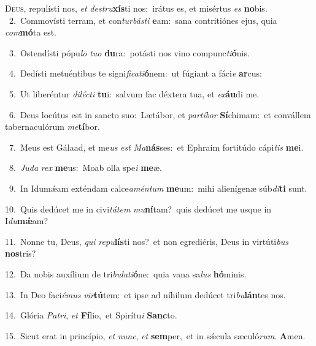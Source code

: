 \lettrine{\initial\textcolor{\initialcolor}{D}}{eus,} repulísti nos, \textit{et} \textit{de}\-\textit{stru}\textbf{xís}ti nos:~\star irátus es, et misértus \textit{es} \textbf{no}\-bis.\\
{\numbfont\textcolor{\numbcolor}{~2.}}~Commovísti terram, et con\-\textit{tur}\-\textit{bás}\textit{ti} \textbf{e}\-am:~\star sana contritiónes ejus, quia \textit{com}\-\textbf{mó}ta est.\par
{\numbfont\textcolor{\numbcolor}{~3.}}~Ostendísti pópu\textit{lo} \textit{tu}\-\textit{o} \textbf{du}\-ra:~\star potásti nos vino compunc\-\textit{ti}\-\textbf{ó}nis.\par
{\numbfont\textcolor{\numbcolor}{~4.}}~Dedísti metuéntibus te signi\-\textit{fi}\-\textit{ca}\textit{ti}\textbf{ó}nem:~\star ut fúgiant a fáci\textit{e} \textbf{ar}\-cus:\par
{\numbfont\textcolor{\numbcolor}{~5.}}~Ut liberéntur \textit{di}\-\textit{léc}\textit{ti} \textbf{tu}\-i:~\star salvum fac déxtera tua, et \textit{ex}\-\textbf{áu}di me.\par
{\numbfont\textcolor{\numbcolor}{~6.}}~Deus locútus est in sancto suo:~\dagger Lætábor, et \textit{par}\-\textit{tí}\textit{bor} \textbf{Sí}\-chimam:~\star et convállem tabernaculórum \textit{me}\-\textbf{tí}bor.\par
{\numbfont\textcolor{\numbcolor}{~7.}}~Meus est Gálaad, et me\textit{us} \textit{est} \textit{Ma}\-\textbf{nás}ses:~\star et Ephraim fortitúdo cápi\textit{tis} \textbf{me}\-i.\par
{\numbfont\textcolor{\numbcolor}{~8.}}~\-\textit{Ju}\-\textit{da} \textit{rex} \textbf{me}\-us:~\star Moab olla spe\textit{i} \textbf{me}\-æ.\par
{\numbfont\textcolor{\numbcolor}{~9.}}~In Idumǽam exténdam calce\-\textit{a}\-\textit{mén}\textit{tum} \textbf{me}\-um:~\star mihi alienígenæ súb\-\textit{di}\-\textbf{ti} sunt.\par
{\numbfont\textcolor{\numbcolor}{10.}}~Quis dedúcet me in civi\-\textit{tá}\-\textit{tem} \textit{mu}\-\textbf{ní}tam?~\star quis dedúcet me usque in I\-\textit{du}\-\textbf{mǽ}am?\par
{\numbfont\textcolor{\numbcolor}{11.}}~Nonne tu, Deus, \textit{qui} \textit{re}\-\textit{pu}\textbf{lís}ti nos?~\star et non egrediéris, Deus in virtúti\textit{bus} \textbf{nos}\-tris?\par
{\numbfont\textcolor{\numbcolor}{12.}}~Da nobis auxílium de tri\-\textit{bu}\-\textit{la}\textit{ti}\textbf{ó}ne:~\star quia vana sa\textit{lus} \textbf{hó}\-minis.\par
{\numbfont\textcolor{\numbcolor}{13.}}~In Deo faci\-\textit{é}\-\textit{mus} \textit{vir}\-\textbf{tú}tem:~\star et ipse ad níhilum dedúcet tri\-\textit{bu}\-\textbf{lán}tes nos.\par
{\numbfont\textcolor{\numbcolor}{14.}}~Glória \textit{Pa}\-\textit{tri}, \textit{et} \textbf{Fí}\-lio,~\star et Spirítu\textit{i} \textbf{Sanc}\-to.\par
{\numbfont\textcolor{\numbcolor}{15.}}~Sicut erat in princípio, \textit{et} \textit{nunc}\-, \textit{et} \textbf{sem}\-per,~\star et in sǽcula sæculó\-\textit{rum}\-. \textbf{A}\-men.\par
